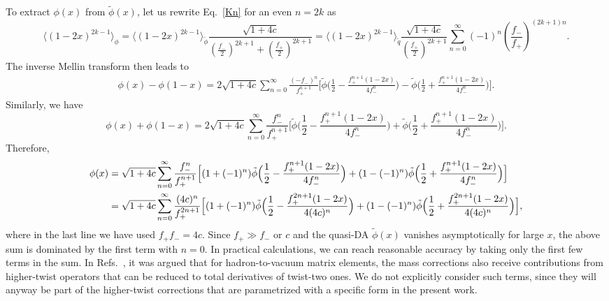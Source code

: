 To extract $\phi(x)$ from $\tilde\phi(x)$, let us rewrite Eq.~\ref{Kn} for an even $n=2k$ as
%
\begin{equation}\label{momentinverserel}
\langle (1-2x)^{2k-1}\rangle_\phi=\langle (1-2x)^{2k-1}\rangle_{\tilde \phi}\frac{\sqrt{1+4c}}{\left(\frac{f_-}{2}\right)^{2k+1}+\left(\frac{f_+}{2}\right)^{2k+1}}=\langle (1-2x)^{2k-1}\rangle_{\tilde q}\frac{\sqrt{1+4c}}{\left(\frac{f_+}{2}\right)^{2k+1}}\sum_{n=0}^\infty (-1)^n\left(\frac{f_-}{f_+}\right)^{(2k+1)n}.
\end{equation}
%
The inverse Mellin transform then leads to
%
\begin{align}
\phi(x)-\phi(1-x)=2\sqrt{1+4c}\sum_{n=0}^\infty \frac{(-f_-)^n}{f_+^{n+1}}\Big[\tilde\phi\Big(\frac{1}{2}-\frac{f_+^{n+1}(1-2x)}{4f_-^n}\Big)-\tilde\phi\Big(\frac{1}{2}+\frac{f_+^{n+1}(1-2x)}{4f_-^n}\Big)\Big].
\end{align}
Similarly, we have
%
\begin{equation}
\phi(x)+\phi(1-x)=2\sqrt{1+4c}\sum_{n=0}^\infty \frac{f_-^n}{f_+^{n+1}}\Big[\tilde\phi\Big(\frac{1}{2}-\frac{f_+^{n+1}(1-2x)}{4f_-^n}\Big)+\tilde\phi\Big(\frac{1}{2}+\frac{f_+^{n+1}(1-2x)}{4f_-^n}\Big)\Big].
\end{equation}
%
Therefore,
%
\begin{align}
\phi(x)&=\sqrt{1+4c}\sum_{n=0}^\infty \frac{f_-^n}{f_+^{n+1}}\Big[(1+(-1)^n)\tilde\phi\Big(\frac{1}{2}-\frac{f_+^{n+1}(1-2x)}{4f_-^n}\Big)+(1-(-1)^n)\tilde\phi\Big(\frac{1}{2}+\frac{f_+^{n+1}(1-2x)}{4f_-^n}\Big)\Big]\nonumber\\
&=\sqrt{1+4c}\sum_{n=0}^\infty \frac{(4c)^n}{f_+^{2n+1}}\Big[(1+(-1)^n)\tilde\phi\Big(\frac{1}{2}-\frac{f_+^{2n+1}(1-2x)}{4(4c)^n}\Big)+(1-(-1)^n)\tilde\phi\Big(\frac{1}{2}+\frac{f_+^{2n+1}(1-2x)}{4(4c)^n}\Big)\Big],
\end{align}
where in the last line we have used $f_+ f_-=4c$. Since $f_+\gg f_-$ or $c$ and the quasi-DA $\tilde \phi(x)$ vanishes asymptotically for large $x$, the above sum is dominated by the first term with $n=0$. In practical calculations, we can reach reasonable accuracy by taking only the first few terms in the sum. In Refs.~\cite{Braun:2011zr,Braun:2011dg}, it was argued that for hadron-to-vacuum matrix elements, the mass corrections also receive contributions from higher-twist operators that can be reduced to total derivatives of twist-two ones. We do not explicitly consider such terms, since they will anyway be part of the higher-twist corrections that are parametrized with a specific form in the present work.


